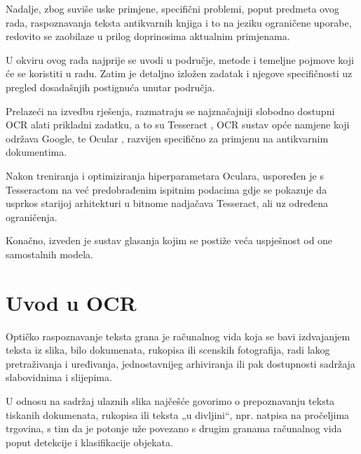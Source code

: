 \documentclass[zavrsnirad]{fer}
\begin{document}
Nadalje, zbog suviše uske primjene, specifični problemi, poput predmeta ovog rada, raspoznavanja teksta antikvarnih knjiga i to na jeziku ograničene uporabe, redovito se zaobilaze u prilog doprinosima aktualnim primjenama. \cite{Olejniczak2022}

U okviru ovog rada najprije se uvodi u područje, metode i temeljne pojmove koji će se koristiti u radu. Zatim je detaljno izložen zadatak i njegove specifičnosti uz pregled dosadašnjih postignuća unutar područja.

Prelazeći na izvedbu rješenja, razmatraju se najznačajniji slobodno dostupni OCR alati prikladni zadatku, a to su Tesseract \cite{Smith2007}, OCR sustav opće namjene koji održava Google, te Ocular \cite{Berg-Kirkpatrick2013}, razvijen specifično za primjenu na antikvarnim dokumentima.

Nakon treniranja i optimiziranja hiperparametara Oculara, uspoređen je s Tesseractom na već predobrađenim ispitnim podacima gdje se pokazuje da usprkos starijoj arhitekturi u bitnome nadjačava Tesseract, ali uz određena ograničenja.

Konačno, izveden je sustav glasanja kojim se postiže veća uspješnost od one samostalnih modela.





\chapter{Uvod u OCR}
\label{pog:ocr_uvod}

Optičko raspoznavanje teksta grana je računalnog vida koja se bavi izdvajanjem teksta iz slika, bilo dokumenata, rukopisa ili scenskih fotografija, radi lakog pretraživanja i uređivanja, jednostavnijeg arhiviranja ili pak dostupnosti sadržaja slabovidnima i slijepima.

U odnosu na sadržaj ulaznih slika najčešće govorimo o prepoznavanju teksta tiskanih dokumenata, rukopisa ili teksta „u divljini“, npr. natpisa na pročeljima trgovina, s tim da je potonje uže povezano s drugim granama računalnog vida poput detekcije i klasifikacije objekata.
\end{document}
